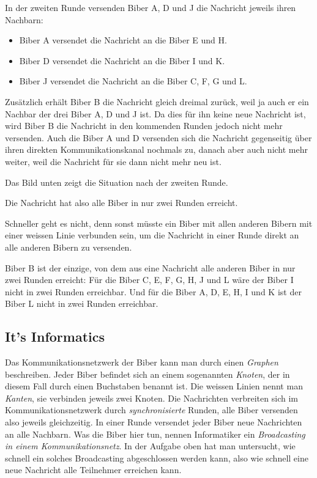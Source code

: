 \documentclass[a4paper,11pt]{report}
\newcommand{\taskGraphicsFolder}{..}
\begin{document}
In der zweiten Runde versenden Biber A, D und J die Nachricht jeweils ihren Nachbarn:

\begin{itemize}
  \item Biber A versendet die Nachricht an die Biber E und H.
  \item Biber D versendet die Nachricht an die Biber I und K.
  \item Biber J versendet die Nachricht an die Biber C, F, G und L.
\end{itemize}

Zusätzlich erhält Biber B die Nachricht gleich dreimal zurück, weil ja auch er ein Nachbar der drei Biber A, D und J ist. Da dies für ihn keine neue Nachricht ist, wird Biber B die Nachricht in den kommenden Runden jedoch nicht mehr versenden. Auch die Biber A und D versenden sich die Nachricht gegenseitig über ihren direkten Kommunikationskanal nochmals zu, danach aber auch nicht mehr weiter, weil die Nachricht für sie dann nicht mehr neu ist.

\begin{samepage}
Das Bild unten zeigt die Situation nach der zweiten Runde.

\nopagebreak

{\centering%
\par}
\end{samepage}

Die Nachricht hat also alle Biber in nur zwei Runden erreicht.

Schneller geht es nicht, denn sonst müsste ein Biber mit allen anderen Bibern mit einer weissen Linie verbunden sein, um die Nachricht in einer Runde direkt an alle anderen Bibern zu versenden.

Biber B ist der einzige, von dem aus eine Nachricht alle anderen Biber in nur zwei Runden erreicht: Für die Biber C, E, F, G, H, J und L wäre der Biber I nicht in zwei Runden erreichbar. Und für die Biber A, D, E, H, I und K ist der Biber L nicht in zwei Runden erreichbar.


\subsection*{It’s Informatics}

Das Kommunikationsnetzwerk der Biber kann man durch einen \emph{Graphen} beschreiben. Jeder Biber befindet sich an einem sogenannten \emph{Knoten}, der in diesem Fall durch einen Buchstaben benannt ist. Die weissen Linien nennt man \emph{Kanten}, sie verbinden jeweils zwei Knoten. Die Nachrichten verbreiten sich im Kommunikationsnetzwerk durch \emph{synchronisierte} Runden, alle Biber versenden also jeweils gleichzeitig. In einer Runde versendet jeder Biber neue Nachrichten an alle Nachbarn. Was die Biber hier tun, nennen Informatiker ein \emph{Broadcasting in einem Kommunikationsnetz}. In der Aufgabe oben hat man untersucht, wie schnell ein solches Broadcasting abgeschlossen werden kann, also wie schnell eine neue Nachricht alle Teilnehmer erreichen kann.
\end{document}
